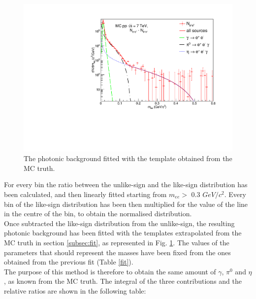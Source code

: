 \documentclass[a4paper,twocolumn,gsifonts,twoside]{gsipaper}
\begin{document}
\newpage
\begin{figure}[tb]
\center
\includegraphics[scale=0.4]{esd_comb.pdf}
\caption{The photonic background fitted with the template obtained from the MC truth.}
\label{photonic}
\end{figure}

For every bin the ratio between the unlike-sign and the like-sign distribution has been calculated, and then linearly fitted starting 
from $m_{ee} >$ 0.3 $GeV/c^{2}$.
Every bin of the like-sign distribution has been then multiplied for the value of the line in the centre of the bin, to obtain the 
normalised distribution.\\

Once subtracted the like-sign distribution from the unlike-sign, the resulting photonic background has been fitted with the templates 
extrapolated from the MC truth in section \ref{subsec:fit}, as represented in Fig. \ref{photonic}.
The values of the parameters that should represent the masses have been fixed from the ones obtained from the previous fit (Table 
\ref{fit}).\\
The purpose of this method is therefore to obtain the same amount of $\gamma$, \space $\pi^{0}$ and $\eta$, as known from the MC truth.
The integral of the three contributions and the relative ratios are shown in the following table:
\end{document}
